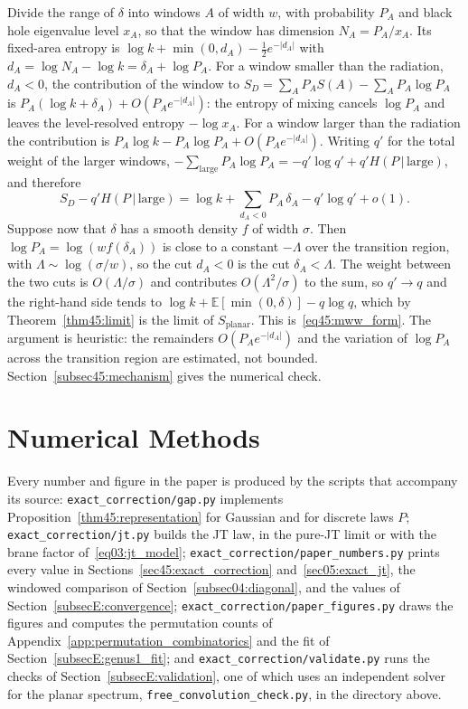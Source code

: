 \documentclass[11pt,letterpaper]{article}
\theoremstyle{plain}
\theoremstyle{definition}
\theoremstyle{remark}
\begin{document}
Divide the range of $\delta$ into windows $A$ of width $w$, with probability $P_A$ and black hole eigenvalue level $x_A$, so that the window has dimension $N_A = P_A/x_A$. Its fixed-area entropy is $\log k + \min(0, d_A) - \tfrac12 e^{-|d_A|}$ with $d_A = \log N_A - \log k = \delta_A + \log P_A$. For a window smaller than the radiation, $d_A < 0$, the contribution of the window to $S_D = \sum_A P_A S(A) - \sum_A P_A \log P_A$ is $P_A(\log k + \delta_A) + O(P_A e^{-|d_A|})$: the entropy of mixing cancels $\log P_A$ and leaves the level-resolved entropy $-\log x_A$. For a window larger than the radiation the contribution is $P_A\log k - P_A\log P_A + O(P_A e^{-|d_A|})$. Writing $q'$ for the total weight of the larger windows, $-\sum_{\mathrm{large}} P_A\log P_A = -q'\log q' + q' H(P\,|\,\mathrm{large})$, and therefore
\begin{equation}
S_D - q' H(P\,|\,\mathrm{large}) = \log k + \sum_{d_A < 0} P_A\,\delta_A - q'\log q' + o(1).
\end{equation}
Suppose now that $\delta$ has a smooth density $f$ of width $\sigma$. Then $\log P_A = \log(w f(\delta_A))$ is close to a constant $-\Lambda$ over the transition region, with $\Lambda \sim \log(\sigma/w)$, so the cut $d_A < 0$ is the cut $\delta_A < \Lambda$. The weight between the two cuts is $O(\Lambda/\sigma)$ and contributes $O(\Lambda^2/\sigma)$ to the sum, so $q' \to q$ and the right-hand side tends to $\log k + \mathbb{E}[\min(0,\delta)] - q\log q$, which by Theorem~\ref{thm45:limit} is the limit of $S_{\mathrm{planar}}$. This is~\eqref{eq45:mww_form}. The argument is heuristic: the remainders $O(P_A e^{-|d_A|})$ and the variation of $\log P_A$ across the transition region are estimated, not bounded. Section~\ref{subsec45:mechanism} gives the numerical check.



\section{Numerical Methods}
\label{app:numerical}

Every number and figure in the paper is produced by the scripts that accompany its source: \texttt{exact\_correction/gap.py} implements Proposition~\ref{thm45:representation} for Gaussian and for discrete laws $P$; \texttt{exact\_correction/jt.py} builds the JT law, in the pure-JT limit or with the brane factor of~\eqref{eq03:jt_model}; \texttt{exact\_correction/paper\_numbers.py} prints every value in Sections~\ref{sec45:exact_correction} and~\ref{sec05:exact_jt}, the windowed comparison of Section~\ref{subsec04:diagonal}, and the values of Section~\ref{subsecE:convergence}; \texttt{exact\_correction/paper\_figures.py} draws the figures and computes the permutation counts of Appendix~\ref{app:permutation_combinatorics} and the fit of Section~\ref{subsecE:genus1_fit}; and \texttt{exact\_correction/validate.py} runs the checks of Section~\ref{subsecE:validation}, one of which uses an independent solver for the planar spectrum, \texttt{free\_convolution\_check.py}, in the directory above.
\end{document}
